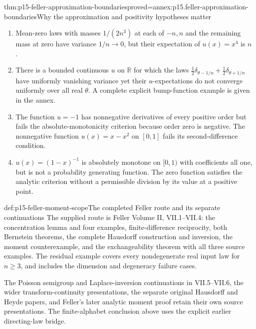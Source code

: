 \begin{hbtheorem}{thm:p15-feller-approximation-boundaries}{proved=annex:p15.feller-approximation-boundaries}{Why the approximation and positivity hypotheses matter}
\begin{enumerate}
\item Mean-zero laws with masses \(1/(2n^3)\) at each of \(-n,n\)
      and the remaining mass at zero have variance \(1/n\to0\),
      but their expectation of \(u(x)=x^4\) is \(n\).
\item There is a bounded continuous \(u\) on \(\mathbb R\) for which
      the laws \(\tfrac12\delta_{\theta-1/n}+\tfrac12\delta_{\theta+1/n}\)
      have uniformly vanishing variance yet their \(u\)-expectations
      do not converge uniformly over all real \(\theta\).
      A complete explicit bump-function example is given in the annex.
\item The function \(u=-1\) has nonnegative derivatives of every
      positive order but fails the absolute-monotonicity criterion
      because order zero is negative.
      The nonnegative function \(u(x)=x-x^2\) on \([0,1]\)
      fails its second-difference condition.
\item \(u(x)=(1-x)^{-1}\) is absolutely monotone on \([0,1)\)
      with coefficients all one, but is not a probability generating
      function. The zero function satisfies the analytic criterion
      without a permissible division by its value at a positive point.
\end{enumerate}
\end{hbtheorem}

\begin{proofboundary}{def:p15-feller-moment-scope}{The completed Feller route and its separate continuations}
The supplied route is Feller Volume II, VII.1--VII.4: the concentration
lemma and four examples, finite-difference reciprocity, both Bernstein
theorems, the complete Hausdorff construction and inversion, the moment
counterexample, and the exchangeability theorem with all three source
examples. The residual example covers every nondegenerate real input law
for \(n\geq3\), and includes the dimension and degeneracy failure cases.

The Poisson semigroup and Laplace-inversion continuations in VII.5--VII.6,
the wider transform-continuity presentations, the separate original
Hausdorff and Heyde papers, and Feller's later analytic moment proof
retain their own source presentations. The finite-alphabet conclusion
above uses the explicit earlier directing-law bridge.
\end{proofboundary}
